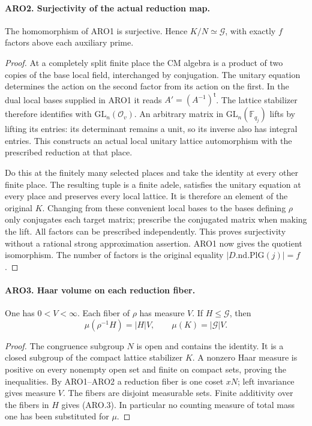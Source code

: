 \documentclass[11pt,a4paper]{article}
\numberwithin{equation}{section}
\theoremstyle{remark}\newtheorem{remark}[theorem]{Remark}
\begin{document}
\paragraph{ARO2. Surjectivity of the actual reduction map.}
\label{claim:ARO2}
The homomorphism of ARO1 is surjective.  Hence
\(K/N\simeq\mathcal G\), with exactly \(f\) factors above each
auxiliary prime.
\begin{proof}
At a completely split finite place the CM algebra is a product of
two copies of the base local field, interchanged by conjugation.
The unitary equation determines the action on the second factor
from its action on the first.  In the dual local bases supplied in
ARO1 it reads \(A'=(A^{-1})^{\mathsf t}\).  The lattice stabilizer
therefore identifies with \(\mathrm{GL}_n(\mathcal O_v)\).
An arbitrary matrix in \(\mathrm{GL}_n(\mathbb F_{q_j})\) lifts by
lifting its entries: its determinant remains a unit, so its inverse
also has integral entries.  This constructs an actual local unitary
lattice automorphism with the prescribed reduction at that place.

Do this at the finitely many selected places and take the identity
at every other finite place.  The resulting tuple is a finite adele,
satisfies the unitary equation at every place and preserves every
local lattice.  It is therefore an element of the original \(K\).
Changing from these convenient local bases to the bases defining
\(\rho\) only conjugates each target matrix; prescribe the conjugated
matrix when making the lift.  All factors can be prescribed
independently.  This proves surjectivity without a rational strong
approximation assertion.  ARO1 now gives the quotient isomorphism.
The number of factors is the original equality
\(|D.\mathrm{nd}.\mathrm{PlG}(j)|=f\).
\end{proof}

\paragraph{ARO3. Haar volume on each reduction fiber.}
\label{claim:ARO3}
One has \(0<V<\infty\).  Each fiber of \(\rho\) has measure \(V\).
If \(H\leq\mathcal G\), then
\[
 \mu(\rho^{-1}H)=|H|V,
 \qquad \mu(K)=|\mathcal G|V.                         \tag{ARO.3}
\]
\begin{proof}
The congruence subgroup \(N\) is open and contains the identity.
It is a closed subgroup of the compact lattice stabilizer \(K\).
A nonzero Haar measure is positive on every nonempty open set and
finite on compact sets, proving the inequalities.  By ARO1--ARO2
a reduction fiber is one coset \(xN\); left invariance gives measure
\(V\).  The fibers are disjoint measurable sets.  Finite additivity
over the fibers in \(H\) gives (ARO.3).  In particular no counting
measure of total mass one has been substituted for \(\mu\).
\end{proof}
\end{document}
